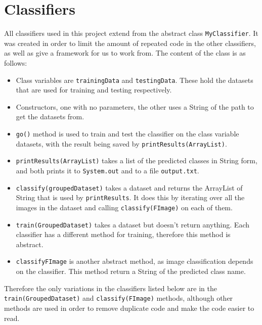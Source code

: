 \documentclass[a4paper,12pt]{article}
\begin{document}
\section{Classifiers}
All classifiers used in this project extend from the abstract class \texttt{MyClassifier}. It was created in order to limit the amount of repeated code in the other classifiers, as well as give a framework for us to work from. The content of the class is as follows:
\begin{itemize}
	\item Class variables are \texttt{trainingData} and \texttt{testingData}. These hold the datasets that are used for training and testing respectively.
	\item Constructors, one with no parameters, the other uses a String of the path to get the datasets from.
	\item \texttt{go()} method is used to train and test the classifier on the class variable datasets, with the result being saved by \texttt{printResults(ArrayList)}.
	\item \texttt{printResults(ArrayList)} takes a list of the predicted classes in String form, and both prints it to \texttt{System.out} and to a file \texttt{output.txt}.
	\item \texttt{classify(groupedDataset)} takes a dataset and returns the ArrayList of String that is used by \texttt{printResults}. It does this by iterating over all the images in the dataset and calling \texttt{classify(FImage)} on each of them.
	\item \texttt{train(GroupedDataset)} takes a dataset but doesn't return anything. Each classifier has a different method for training, therefore this method is abstract.
	\item \texttt{classify{FImage}} is another abstract method, as image classification depends on the classifier. This method return a String of the predicted class name.
\end{itemize}
Therefore the only variations in the classifiers listed below are in the \texttt{train(GroupedDataset)} and \texttt{classify(FImage)} methods, although other methods are used in order to remove duplicate code and make the code easier to read.

\end{document}
